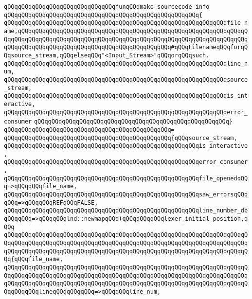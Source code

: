 \newline
\verb|qQQqqQQqqQQqqQQqqQQqqQQqqQQqqQQqfunqQQqmake_sourcecode_info|\newline
\verb|qQQqqQQqqQQqqQQqqQQqqQQqqQQqqQQqqQQqqQQqqQQqqQQqqQQqqQQq{|\newline
\verb|qQQqqQQqqQQqqQQqqQQqqQQqqQQqqQQqqQQqqQQqqQQqqQQqqQQqqQQqqQQqqQQqfile_name,qQQqqQQqqQQqqQQqqQQqqQQqqQQqqQQqqQQqqQQqqQQqqQQqqQQqqQQqqQQqqQQqqQQqqQQqqQQqqQQqqQQqqQQqqQQqqQQqqQQqqQQqqQQqqQQqqQQqqQQqqQQqqQQqqQQqqQQqqQQqqQQqqQQqqQQqqQQqqQQqqQQqqQQqqQQqqQQqqQQqqQQq#qQQqFilenameqQQqforqQQqsource_stream,qQQqelseqQQq"<Input_Stream>"qQQqorqQQqsuch.|\newline
\verb|qQQqqQQqqQQqqQQqqQQqqQQqqQQqqQQqqQQqqQQqqQQqqQQqqQQqqQQqqQQqqQQqline_num,|\newline
\verb|qQQqqQQqqQQqqQQqqQQqqQQqqQQqqQQqqQQqqQQqqQQqqQQqqQQqqQQqqQQqqQQqsource_stream,|\newline
\verb|qQQqqQQqqQQqqQQqqQQqqQQqqQQqqQQqqQQqqQQqqQQqqQQqqQQqqQQqqQQqqQQqis_interactive,|\newline
\verb|qQQqqQQqqQQqqQQqqQQqqQQqqQQqqQQqqQQqqQQqqQQqqQQqqQQqqQQqqQQqqQQqerror_consumer|\newline
\verb|qQQqqQQqqQQqqQQqqQQqqQQqqQQqqQQqqQQqqQQqqQQqqQQqqQQqqQQq}|\newline
\verb|qQQqqQQqqQQqqQQqqQQqqQQqqQQqqQQqqQQqqQQqqQQqqQQq=|\newline
\verb|qQQqqQQqqQQqqQQqqQQqqQQqqQQqqQQqqQQqqQQqqQQqqQQq{qQQqsource_stream,|\newline
\verb|qQQqqQQqqQQqqQQqqQQqqQQqqQQqqQQqqQQqqQQqqQQqqQQqqQQqqQQqis_interactive,|\newline
\verb|qQQqqQQqqQQqqQQqqQQqqQQqqQQqqQQqqQQqqQQqqQQqqQQqqQQqqQQqerror_consumer,|\newline
\verb|qQQqqQQqqQQqqQQqqQQqqQQqqQQqqQQqqQQqqQQqqQQqqQQqqQQqqQQqfile_openedqQQq=>qQQqqQQqfile_name,|\newline
\verb|qQQqqQQqqQQqqQQqqQQqqQQqqQQqqQQqqQQqqQQqqQQqqQQqqQQqqQQqsaw_errorsqQQqqQQq=>qQQqqQQqREFqQQqFALSE,|\newline
\verb|qQQqqQQqqQQqqQQqqQQqqQQqqQQqqQQqqQQqqQQqqQQqqQQqqQQqqQQqline_number_dbqQQqqQQq=>qQQqqQQqlnd::newmapqQQq(qQQqqQQqqQQqlexer_initial_position,qQQq|\newline
\verb|qQQqqQQqqQQqqQQqqQQqqQQqqQQqqQQqqQQqqQQqqQQqqQQqqQQqqQQqqQQqqQQqqQQqqQQqqQQqqQQqqQQqqQQqqQQqqQQqqQQqqQQqqQQqqQQqqQQqqQQqqQQqqQQqqQQqqQQqqQQqqQQqqQQqqQQqqQQqqQQqqQQqqQQqqQQqqQQqqQQqqQQqqQQqqQQqqQQqqQQqqQQqqQQqqQQq{qQQqfile_name,|\newline
\verb|qQQqqQQqqQQqqQQqqQQqqQQqqQQqqQQqqQQqqQQqqQQqqQQqqQQqqQQqqQQqqQQqqQQqqQQqqQQqqQQqqQQqqQQqqQQqqQQqqQQqqQQqqQQqqQQqqQQqqQQqqQQqqQQqqQQqqQQqqQQqqQQqqQQqqQQqqQQqqQQqqQQqqQQqqQQqqQQqqQQqqQQqqQQqqQQqqQQqqQQqqQQqqQQqqQQqqQQqqQQqlineqQQqqQQqqQQq=>qQQqqQQqline_num,|\newline
